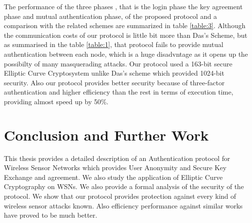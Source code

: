 \documentclass[a4paper,12pt]{report}
\begin{document}
\begin{table}[h!]
\begin{center}
\caption{The communication costs of cryptographic operations}
\end{center}
\label{table:3}
\end{table}
The performance of the three phases , that is the login phase the
key agreement phase and mutual authentication phase, of the proposed
protocol and a comparison with the related schemes are summarized in
table \ref{table:3}. Although the communication costs of our
protocol is little bit more than Das's Scheme, but as summarised in the table \ref{table:1}, that protocol fails to provide mutual authentication between each node, which is a huge disadvntage as it opens up the possibilty of many masquerading attacks. Our protocol used a 163-bit secure Elliptic Curve Cryptosystem unlike Das's scheme which provided 1024-bit security. Also our protocol
provides better security because of three-factor authentication and
higher efficiency than the rest in terms of execution time,
providing almost speed up by 50\%.






\afterpage{\null\newpage}
\chapter{Conclusion and Further Work}
\label{Ch6} This thesis provides a detailed description of an
Authentication protocol for Wireless Sensor Networks which provides
User Anonymity and Secure Key Exchange and agreement. We also study
the application of Elliptic Curve Cryptography on WSNs. We also
provide a formal analysis of the security of the protocol. We show
that our protocol provides protection against every kind of wireless
sensor attacks known. Also efficiency performance against similar
works have proved to be much better.
\end{document}
